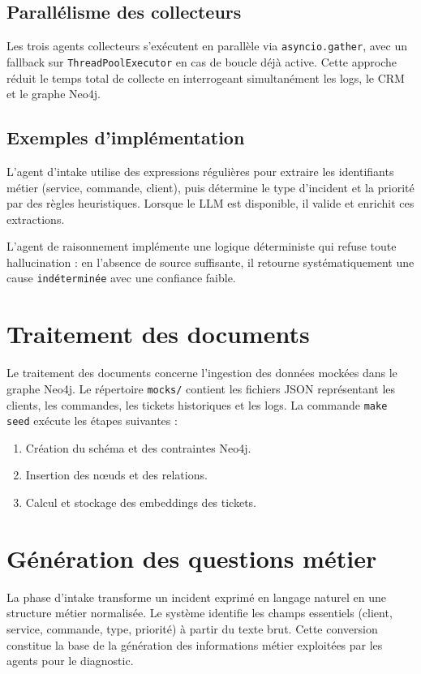 \subsection{Parallélisme des collecteurs}
Les trois agents collecteurs s'exécutent en parallèle via \texttt{asyncio.gather}, avec un fallback sur \texttt{ThreadPoolExecutor} en cas de boucle déjà active. Cette approche réduit le temps total de collecte en interrogeant simultanément les logs, le CRM et le graphe Neo4j.

\subsection{Exemples d'implémentation}
L'agent d'intake utilise des expressions régulières pour extraire les identifiants métier (service, commande, client), puis détermine le type d'incident et la priorité par des règles heuristiques. Lorsque le LLM est disponible, il valide et enrichit ces extractions.

L'agent de raisonnement implémente une logique déterministe qui refuse toute hallucination : en l'absence de source suffisante, il retourne systématiquement une cause \texttt{indéterminée} avec une confiance faible.

\section{Traitement des documents}
Le traitement des documents concerne l'ingestion des données mockées dans le graphe Neo4j. Le répertoire \texttt{mocks/} contient les fichiers JSON représentant les clients, les commandes, les tickets historiques et les logs. La commande \texttt{make seed} exécute les étapes suivantes :

\begin{enumerate}
    \item Création du schéma et des contraintes Neo4j.
    \item Insertion des nœuds et des relations.
    \item Calcul et stockage des embeddings des tickets.
\end{enumerate}

\section{Génération des questions métier}
La phase d'intake transforme un incident exprimé en langage naturel en une structure métier normalisée. Le système identifie les champs essentiels (client, service, commande, type, priorité) à partir du texte brut. Cette conversion constitue la base de la génération des informations métier exploitées par les agents pour le diagnostic.

